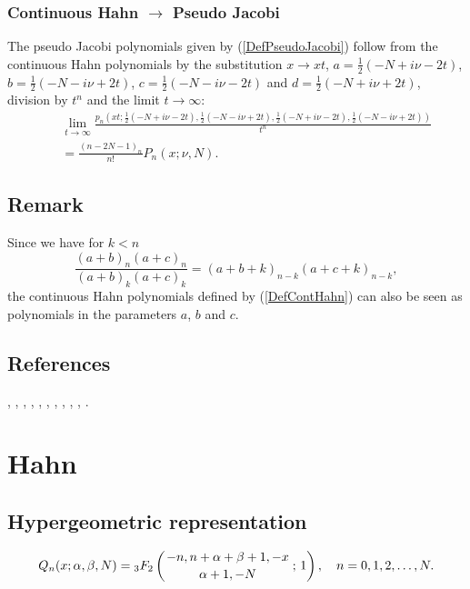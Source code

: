 \documentclass[envcountchap,graybox]{svmono}
\newcounter{rom}
\newcommand{\hyp}[5]{\mbox{}_{#1}{F}_{#2}
\left(\genfrac{}{}{0pt}{}{#3}{#4}\,;\,#5\right)}
\begin{document}
\subsubsection*{Continuous Hahn $\rightarrow$ Pseudo Jacobi}
The pseudo Jacobi polynomials given by (\ref{DefPseudoJacobi}) follow from the continuous
Hahn polynomials by the substitution $x\rightarrow xt$, $a=\frac{1}{2}(-N+i\nu-2t)$,
$b=\frac{1}{2}(-N-i\nu+2t)$, $c=\frac{1}{2}(-N-i\nu-2t)$ and $d=\frac{1}{2}(-N+i\nu+2t)$,
division by $t^n$ and the limit $t\rightarrow\infty$:
\begin{eqnarray}
& &\lim_{t\rightarrow\infty}\frac{p_n(xt;\frac{1}{2}(-N+i\nu-2t),\frac{1}{2}(-N-i\nu+2t),
\frac{1}{2}(-N+i\nu-2t),\frac{1}{2}(-N-i\nu+2t))}{t^n}\nonumber\\
& &{}=\frac{(n-2N-1)_n}{n!}P_n(x;\nu,N).
\end{eqnarray}

\subsection*{Remark}
Since we have for $k<n$
$$\frac{(a+b)_n(a+c)_n}{(a+b)_k(a+c)_k}=(a+b+k)_{n-k}(a+c+k)_{n-k},$$
the continuous Hahn polynomials defined by (\ref{DefContHahn}) can also be seen as polynomials
in the parameters $a$, $b$ and $c$.

\subsection*{References}
\cite{Askey85}, \cite{Askey89I}, \cite{AtakRahmanSuslov},
\cite{AtakSuslov85}, \cite{Badertscher}, \cite{Gupta91}, \cite{Koelink96II},
\cite{Koorn88}, \cite{Lesky94II}, \cite{Lesky95II}, \cite{Lesky97}.


\section{Hahn}

\par\setcounter{equation}{0}

\subsection*{Hypergeometric representation}
\begin{equation}
\label{DefHahn}
Q_n(x;\alpha,\beta,N)=\hyp{3}{2}{-n,n+\alpha+\beta+1,-x}{\alpha+1,-N}{1},\quad n=0,1,2,\ldots,N.
\end{equation}
\end{document}
